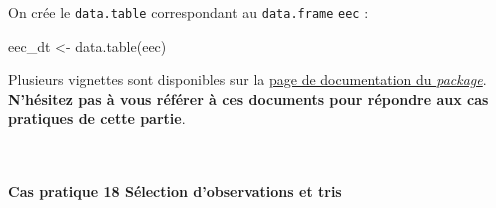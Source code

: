 \documentclass[12pt,]{article}
\newenvironment{Shaded}{}{}
\newcommand{\KeywordTok}[1]{\textcolor[rgb]{0.00,0.00,1.00}{{#1}}}
\newcommand{\StringTok}[1]{\textcolor[rgb]{0.00,0.50,0.50}{{#1}}}
\newcommand{\NormalTok}[1]{{#1}}
\let\oldparagraph\paragraph
\renewcommand{\paragraph}[1]{\oldparagraph{#1}\mbox{}}
\begin{document}
On crée le \texttt{data.table} correspondant au \texttt{data.frame}
\texttt{eec} :

\begin{Shaded}
\begin{Highlighting}[]
\NormalTok{eec_dt <-}\StringTok{ }\KeywordTok{data.table}\NormalTok{(eec)}
\end{Highlighting}
\end{Shaded}

Plusieurs vignettes sont disponibles sur la
\href{https://CRAN.R-project.org/package=data.table}{page de
documentation du \emph{package}}. \textbf{N'hésitez pas à vous référer à
ces documents pour répondre aux cas pratiques de cette partie}.

~

\paragraph{\texorpdfstring{\textbf{Cas pratique 18} Sélection
d'observations et
tris}{Cas pratique 18 Sélection d'observations et tris}}\label{cas-pratique-18-selection-dobservations-et-tris}
\end{document}

